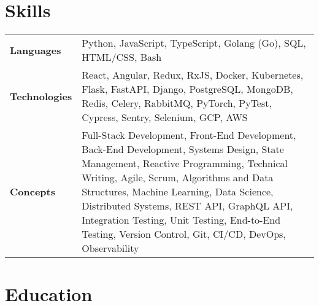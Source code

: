 \documentclass{ethan_cv}
\begin{document}
\section{Skills}
    \small
    \begin{tabular}{p{2.25cm} p{16cm}}
        \textbf{Languages} & Python, JavaScript, TypeScript, Golang (Go), SQL, HTML/CSS, Bash \\ 
        \textbf{Technologies} & React, Angular, Redux, RxJS, Docker, Kubernetes, Flask, FastAPI, Django, PostgreSQL, MongoDB, Redis, Celery, RabbitMQ, PyTorch, PyTest, Cypress, Sentry, Selenium, GCP, AWS \\
        \textbf{Concepts} & Full-Stack Development, Front-End Development, Back-End Development, Systems Design, State Management, Reactive Programming, Technical Writing, Agile, Scrum, Algorithms and Data Structures, Machine Learning, Data Science, Distributed Systems, REST API, GraphQL API, Integration Testing, Unit Testing, End-to-End Testing, Version Control, Git, CI/CD, DevOps, Observability
    \end{tabular}
    \vspace{+3mm}


\section{Education}
\end{document}
